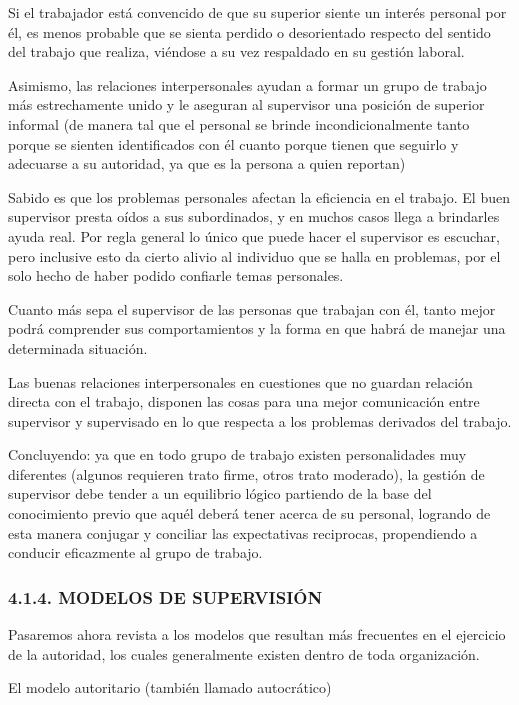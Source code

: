 Si el trabajador está convencido de que su superior siente un interés personal por él, es menos probable que se sienta perdido o desorientado respecto del sentido del trabajo que realiza, viéndose a su vez respaldado en su gestión laboral.

Asimismo, las relaciones interpersonales ayudan a formar un grupo de trabajo más estrechamente unido y le aseguran al supervisor una posición de superior informal (de manera tal que el personal se brinde incondicionalmente tanto porque se sienten identificados con él cuanto porque tienen que seguirlo y adecuarse a su autoridad, ya que es la persona a quien reportan)

Sabido es que los problemas personales afectan la eficiencia en el trabajo. El buen supervisor presta oídos a sus subordinados, y en muchos casos llega a brindarles ayuda real. Por regla general lo único que puede hacer el supervisor es escuchar, pero inclusive esto da cierto alivio al individuo que se halla en problemas, por el solo hecho de haber podido confiarle temas personales.

Cuanto más sepa el supervisor de las personas que trabajan con él, tanto mejor podrá comprender sus comportamientos y la forma en que habrá de manejar una determinada situación.

Las buenas relaciones interpersonales en cuestiones que no guardan relación directa con el trabajo, disponen las cosas para una mejor comunicación entre supervisor y supervisado en lo que respecta a los problemas derivados del trabajo.

Concluyendo: ya que en todo grupo de trabajo existen personalidades muy diferentes (algunos requieren trato firme, otros trato moderado), la gestión de supervisor debe tender a un equilibrio lógico partiendo de la base del conocimiento previo que aquél deberá tener acerca de su personal, logrando de esta manera conjugar y conciliar las expectativas reciprocas, propendiendo a conducir eficazmente al grupo de trabajo.

\subsubsection*{4.1.4. MODELOS DE SUPERVISIÓN}


Pasaremos ahora revista a los modelos que resultan más frecuentes en el ejercicio de la autoridad, los cuales generalmente existen dentro de toda organización.

El modelo autoritario (también llamado autocrático)

